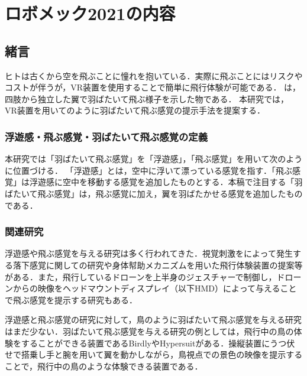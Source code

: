 \chapter[ロボメック2021の内容]%
        {ロボメック2021の内容}
    
\section{緒言}



ヒトは古くから空を飛ぶことに憧れを抱いている．実際に飛ぶことにはリスクやコストが伴うが，VR装置を使用することで簡単に飛行体験が可能である．
は，四肢から独立した翼で羽ばたいて飛ぶ様子を示した物である．
本研究では，
VR装置を用いてのように羽ばたいて飛ぶ感覚の提示手法を提案する．

    \subsection{浮遊感・飛ぶ感覚・羽ばたいて飛ぶ感覚の定義}
    本研究では「羽ばたいて飛ぶ感覚」を「浮遊感」，「飛ぶ感覚」を用いて次のように位置づける．
    「浮遊感」とは，空中に浮いて漂っている感覚を指す．「飛ぶ感覚」は浮遊感に空中を移動する感覚を追加したものとする．本稿で注目する「羽ばたいて飛ぶ感覚」は，飛ぶ感覚に加え，翼を羽ばたかせる感覚を追加したものである．

    \subsection{関連研究}    
    浮遊感や飛ぶ感覚を与える研究は多く行われてきた．視覚刺激をによって発生する落下感覚に関しての研究\cite{奥川夏輝2017VR空間における視覚刺激によって発生する落下感覚の分析}や身体幇助メカニズムを用いた飛行体験装置の提案\cite{鈴木拓馬2014hmd}等がある．また，飛行しているドローンを上半身のジェスチャーで制御し，ドローンからの映像をヘッドマウントディスプレイ（以下HMD）によって与えることで飛ぶ感覚を提示する研究\cite{rognon2018flyjacket}もある．

    浮遊感と飛ぶ感覚の研究に対して，鳥のように羽ばたいて飛ぶ感覚を与える研究はまだ少ない．羽ばたいて飛ぶ感覚を与える研究の例としては，飛行中の鳥の体験をすることができる装置であるBirdly\cite{rheiner2014birdly}やHypersuit\cite{hypersuit}がある．操縦装置にうつ伏せで搭乗し手と腕を用いて翼を動かしながら，鳥視点での景色の映像を提示することで，飛行中の鳥のような体験できる装置である．

